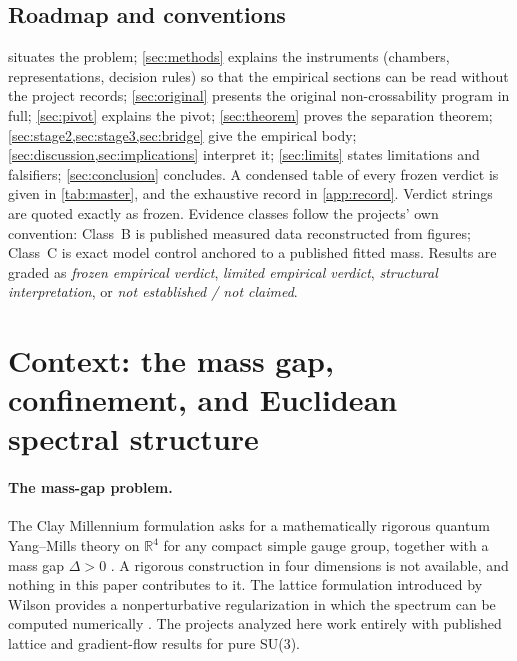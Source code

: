 \documentclass[11pt,a4paper]{article}
\theoremstyle{definition}
\theoremstyle{remark}
\begin{document}
\subsection{Roadmap and conventions}
 situates the problem; \cref{sec:methods} explains the instruments (chambers, representations, decision rules) so that the empirical sections can be read without the project records; \cref{sec:original} presents the original non-crossability program in full; \cref{sec:pivot} explains the pivot; \cref{sec:theorem} proves the separation theorem; \cref{sec:stage2,sec:stage3,sec:bridge} give the empirical body; \cref{sec:discussion,sec:implications} interpret it; \cref{sec:limits} states limitations and falsifiers; \cref{sec:conclusion} concludes. A condensed table of every frozen verdict is given in \cref{tab:master}, and the exhaustive record in \cref{app:record}. Verdict strings are quoted exactly as frozen. Evidence classes follow the projects' own convention: Class~B is published measured data reconstructed from figures; Class~C is exact model control anchored to a published fitted mass. Results are graded as \emph{frozen empirical verdict}, \emph{limited empirical verdict}, \emph{structural interpretation}, or \emph{not established / not claimed}.

\section{Context: the mass gap, confinement, and Euclidean spectral structure}\label{sec:related}

\paragraph{The mass-gap problem.} The Clay Millennium formulation asks for a mathematically rigorous quantum Yang--Mills theory on $\mathbb R^4$ for any compact simple gauge group, together with a mass gap $\Delta>0$ \cite{JaffeWitten}. A rigorous construction in four dimensions is not available, and nothing in this paper contributes to it. The lattice formulation introduced by Wilson \cite{Wilson74} provides a nonperturbative regularization in which the spectrum can be computed numerically \cite{Creutz80,GattringerLang}. The projects analyzed here work entirely with published lattice and gradient-flow results for pure SU(3).
\end{document}
